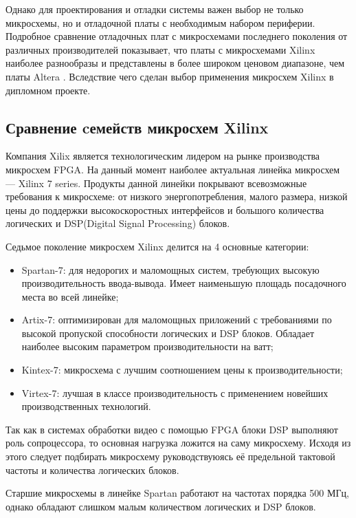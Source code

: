 Однако для проектирования и отладки системы важен выбор не только микросхемы,
но и отладочной платы с необходимым набором периферии. Подробное сравнение отладочных
плат с микросхемами последнего поколения от различных производителей показывает, что
платы с микросхемами Xilinx наиболее разнообразы и представлены в более широком ценовом диапазоне,
чем платы Altera \cite{fpga_boards_comparison}.
Вследствие чего сделан выбор применения микросхем Xilinx в дипломном проекте.

\subsection{Сравнение cемейств микросхем Xilinx}
\label{sub:domain:fpga_comparison}

Компания Xilix является технологическим лидером на рынке производства микросхем FPGA.
На данный момент наиболее актуальная линейка микросхем --- Xilinx 7 series\cite{7_series_overview}.
Продукты данной линейки покрывают всевозможные требования к микросхеме: от низкого энергопотребления, малого размера, низкой цены до
поддержки высокоскоростных интерфейсов и большого количества логических и DSP(Digital Signal Processing) блоков.

Седьмое поколение микросхем Xilinx делится на 4 основные категории:
\begin{itemize}
  \item Spartan-7: для недорогих и маломощных систем, требующих высокую производительность ввода-вывода.
    Имеет наименьшую площадь посадочного места во всей линейке;
  \item Artix-7: оптимизирован для маломощных приложений с требованиями по высокой пропуской способности логических и DSP блоков.
    Обладает наиболее высоким параметром производительности на ватт;
  \item Kintex-7: микросхема с лучшим соотношением цены к производительности;
  \item Virtex-7: лучшая в классе производительность с применением новейших производственных технологий.
\end{itemize}

Так как в системах обработки видео с помощью FPGA блоки DSP выполняют роль сопроцессора, то
основная нагрузка ложится на саму микросхему. Исходя из этого следует подбирать микросхему
руководствуюясь её предельной тактовой частоты и количества логических блоков\cite{7_series_selection_guide}.

Старшие микросхемы в линейке Spartan работают на частотах порядка 500 МГц, однако обладают слишком малым количеством
логических и DSP блоков.

